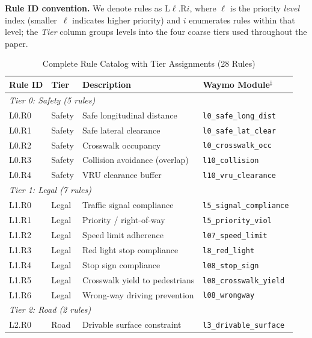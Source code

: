 \noindent\textbf{Rule ID convention.}  We denote rules as $\mathrm{L}\ell.\mathrm{R}i$, where $\ell$ is the priority \emph{level} index (smaller~$\ell$ indicates higher priority) and $i$ enumerates rules within that level; the \emph{Tier} column groups levels into the four coarse tiers used throughout the paper.

\begin{table}[h]
\centering
\caption{Complete Rule Catalog with Tier Assignments (28 Rules)}
\label{tab:rule_catalog}
\small
\begin{tabular}{llp{4.5cm}p{3.5cm}}
\toprule
\textbf{Rule ID} & \textbf{Tier} & \textbf{Description} & \textbf{Waymo Module}$^\ddagger$ \\
\midrule
\multicolumn{4}{l}{\textit{Tier 0: Safety (5 rules)}} \\
L0.R0 & Safety & Safe longitudinal distance & \texttt{\footnotesize l0\_safe\_long\_dist} \\
L0.R1 & Safety & Safe lateral clearance & \texttt{\footnotesize l0\_safe\_lat\_clear} \\
L0.R2 & Safety & Crosswalk occupancy & \texttt{\footnotesize l0\_crosswalk\_occ} \\
L0.R3 & Safety & Collision avoidance (overlap) & \texttt{\footnotesize l10\_collision} \\
L0.R4 & Safety & VRU clearance buffer & \texttt{\footnotesize l10\_vru\_clearance} \\
\midrule
\multicolumn{4}{l}{\textit{Tier 1: Legal (7 rules)}} \\
L1.R0 & Legal & Traffic signal compliance & \texttt{\footnotesize l5\_signal\_compliance} \\
L1.R1 & Legal & Priority / right-of-way & \texttt{\footnotesize l5\_priority\_viol} \\
L1.R2 & Legal & Speed limit adherence & \texttt{\footnotesize l07\_speed\_limit} \\
L1.R3 & Legal & Red light stop compliance & \texttt{\footnotesize l8\_red\_light} \\
L1.R4 & Legal & Stop sign compliance & \texttt{\footnotesize l08\_stop\_sign} \\
L1.R5 & Legal & Crosswalk yield to pedestrians & \texttt{\footnotesize l08\_crosswalk\_yield} \\
L1.R6 & Legal & Wrong-way driving prevention & \texttt{\footnotesize l08\_wrongway} \\
\midrule
\multicolumn{4}{l}{\textit{Tier 2: Road (2 rules)}} \\
L2.R0 & Road & Drivable surface constraint & \texttt{\footnotesize l3\_drivable\_surface} \\

\end{tabular}
\end{table}
